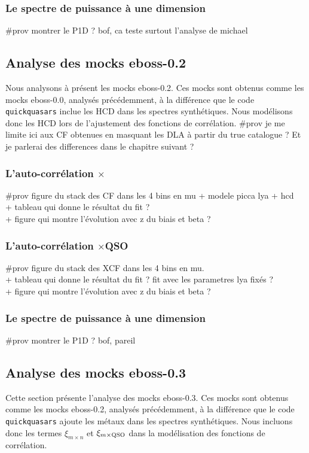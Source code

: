 \documentclass[11pt, twoside, a4paper, openright]{report}
\begin{document}
\subsubsection{Le spectre de puissance à une dimension}
\#prov montrer le P1D ?
bof, ca teste surtout l'analyse de michael


\subsection{Analyse des mocks eboss-0.2}
Nous analysons à présent les mocks eboss-0.2. Ces mocks sont obtenus comme les mocks eboss-0.0, analysés précédemment, à la différence que le code \texttt{quickquasars} inclue les HCD dans les spectres synthétiques. Nous modélisons donc les HCD lors de l'ajustement des fonctions de corrélation.
\#prov je me limite ici aux CF obtenues en masquant les DLA à partir du true catalogue ? Et je parlerai des differences dans le chapitre suivant ? 

\subsubsection{L'auto-corrélation \lya{}$\times$\lya{}}
\#prov figure du stack des CF dans les 4 bins en mu + modele picca lya + hcd \\
+ tableau qui donne le résultat du fit ? \\
+ figure qui montre l'évolution avec z du biais et beta ?


\subsubsection{L'auto-corrélation \lya{}$\times$QSO}
\#prov figure du stack des XCF dans les 4 bins en mu. \\
+ tableau qui donne le résultat du fit ? fit avec les parametres lya fixés ?\\ 
+ figure qui montre l'évolution avec z du biais et beta ? 


\subsubsection{Le spectre de puissance à une dimension}
\#prov montrer le P1D ? bof, pareil



\subsection{Analyse des mocks eboss-0.3}
Cette section présente l'analyse des mocks eboss-0.3. Ces mocks sont obtenus comme les mocks eboss-0.2, analysés précédemment, à la différence que le code \texttt{quickquasars} ajoute les métaux dans les spectres synthétiques. Nous incluons donc les termes $\xi_{m\times n}$ et $\xi_{m\times \textsc{QSO}}$ dans la modélisation des fonctions de corrélation.
\end{document}
